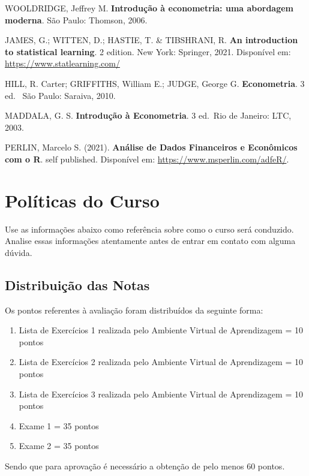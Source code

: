 \documentclass[11pt,]{article}
\providecommand{\tightlist}{%
  \setlength{\itemsep}{0pt}\setlength{\parskip}{0pt}}
\begin{document}
WOOLDRIDGE, Jeffrey M. \textbf{Introdução à econometria: uma abordagem
moderna}. São Paulo: Thomson, 2006.

JAMES, G.; WITTEN, D.; HASTIE, T. \& TIBSHRANI, R. \textbf{An
introduction to statistical learning}. 2 edition. New York: Springer,
2021. Disponível em: \url{https://www.statlearning.com/}

HILL, R. Carter; GRIFFITHS, William E.; JUDGE, George G.
\textbf{Econometria}. 3 ed.~ São Paulo: Saraiva, 2010.

MADDALA, G. S. \textbf{Introdução à Econometria}. 3 ed.~Rio de Janeiro:
LTC, 2003.

PERLIN, Marcelo S. (2021). \textbf{Análise de Dados Financeiros e
Econômicos com o R}. self published. Disponível em:
\url{https://www.msperlin.com/adfeR/}.

\hypertarget{poluxedticas-do-curso}{%
\section{Políticas do Curso}\label{poluxedticas-do-curso}}

Use as informações abaixo como referência sobre como o curso será
conduzido. Analise essas informações atentamente antes de entrar em
contato com alguma dúvida.

\hypertarget{distribuiuxe7uxe3o-das-notas}{%
\subsection{Distribuição das Notas}\label{distribuiuxe7uxe3o-das-notas}}

Os pontos referentes à avaliação foram distribuídos da seguinte forma:

\begin{enumerate}
\def\labelenumi{\arabic{enumi})}
\tightlist
\item
  Lista de Exercícios 1 realizada pelo Ambiente Virtual de Aprendizagem
  = 10 pontos
\item
  Lista de Exercícios 2 realizada pelo Ambiente Virtual de Aprendizagem
  = 10 pontos
\item
  Lista de Exercícios 3 realizada pelo Ambiente Virtual de Aprendizagem
  = 10 pontos
\item
  Exame 1 = 35 pontos
\item
  Exame 2 = 35 pontos
\end{enumerate}

Sendo que para aprovação é necessário a obtenção de pelo menos 60
pontos.
\end{document}
